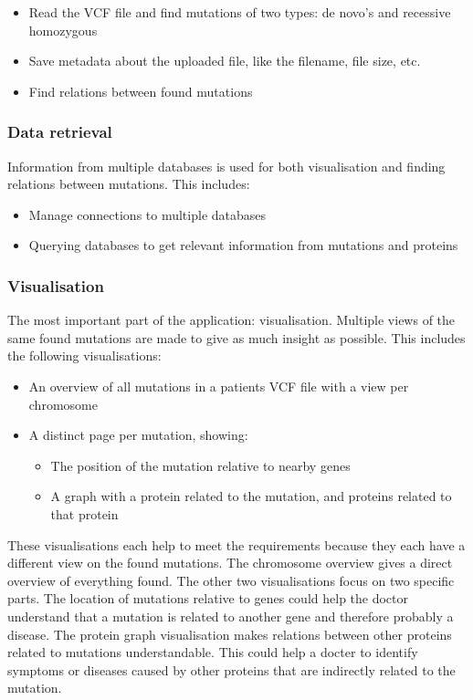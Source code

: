 \begin{itemize}
  \item Read the VCF file and find mutations of two types: de novo's and recessive homozygous
  \item Save metadata about the uploaded file, like the filename, file size, etc.
  \item Find relations between found mutations
\end{itemize}

\subsubsection{Data retrieval}

Information from multiple databases is used for both visualisation and finding relations between mutations. This includes:

\begin{itemize}
  \item Manage connections to multiple databases
  \item Querying databases to get relevant information from mutations and proteins
\end{itemize}

\subsubsection{Visualisation}

The most important part of the application: visualisation. Multiple views of the same found mutations are made to give as much insight as possible. This includes the following visualisations:

\begin{itemize}
  \item An overview of all mutations in a patients VCF file with a view per chromosome
  \item A distinct page per mutation, showing:
  \begin{itemize}
     \item The position of the mutation relative to nearby genes
     \item A graph with a protein related to the mutation, and proteins related to that protein
  \end{itemize}
\end{itemize}

These visualisations each help to meet the requirements because they each have a different view on the found mutations. The chromosome overview gives a direct overview of everything found. The other two visualisations focus on two specific parts. The location of mutations relative to genes could help the doctor understand that a mutation is related to another gene and therefore probably a disease. The protein graph visualisation makes relations between other proteins related to mutations understandable. This could help a docter to identify symptoms or diseases caused by other proteins that are indirectly related to the mutation.